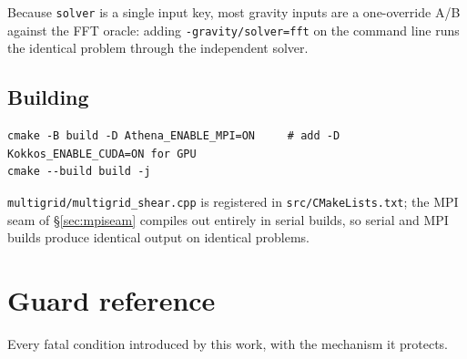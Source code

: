 \documentclass[11pt]{article}
\newcommand{\code}[1]{\texttt{#1}}
\newcommand{\file}[1]{\texttt{\small #1}}
\begin{document}
\noindent
Because \code{solver} is a single input key, most gravity inputs are a one-override
A/B against the FFT oracle: adding \code{-gravity/solver=fft} on the command line runs
the identical problem through the independent solver.

\subsection{Building}

\begin{lstlisting}
cmake -B build -D Athena_ENABLE_MPI=ON     # add -D Kokkos_ENABLE_CUDA=ON for GPU
cmake --build build -j
\end{lstlisting}

\noindent
\file{multigrid/multigrid\_shear.cpp} is registered in \file{src/CMakeLists.txt}; the
MPI seam of \S\ref{sec:mpiseam} compiles out entirely in serial builds, so serial and
MPI builds produce identical output on identical problems.

\section{Guard reference}
\label{sec:guards}

Every fatal condition introduced by this work, with the mechanism it protects.
\end{document}
